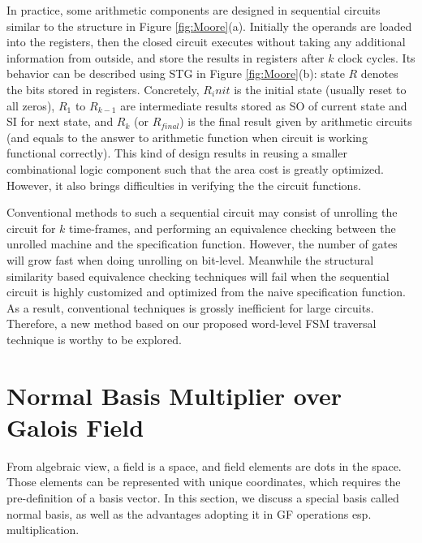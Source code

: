 In practice,
some arithmetic components are designed in sequential circuits similar to the structure in 
Figure \ref{fig:Moore}(a). Initially the operands are loaded into the registers, 
then the closed circuit executes without taking any additional information from outside,
and store the results in registers after $k$ clock cycles. Its behavior can be described using
STG in Figure \ref{fig:Moore}(b): state $R$ denotes the bits stored in registers. Concretely, $R_init$ is the initial
state (usually reset to all zeros), $R_1$ to $R_{k-1}$ are intermediate results stored as SO of current state and SI
for next state, and $R_k$ (or $R_{final}$) is the final result given by arithmetic circuits (and equals to the answer
to arithmetic function when circuit is working functional correctly).
This kind of design results in 
reusing a smaller combinational logic component such that the area cost is greatly optimized.
However, it also brings difficulties in verifying the the circuit functions.

\begin{figure}[H]
\end{figure}

Conventional methods to such a sequential circuit may consist of unrolling the circuit for 
$k$ time-frames, and performing an equivalence checking between the unrolled machine and
the specification function. However, the number of gates will grow fast when doing unrolling
on bit-level. Meanwhile the structural similarity based equivalence checking techniques 
will fail when the sequential circuit is highly customized and optimized from the naive specification 
function. As a result, conventional techniques is grossly inefficient for large circuits.
Therefore, a new method based on our proposed word-level FSM traversal technique is worthy to be explored.

\section{Normal Basis Multiplier over Galois Field}
From algebraic view, a field is a space, and field elements are dots in the space. Those elements can be 
represented with unique coordinates, which requires the pre-definition of a basis vector. In this
section, we discuss a special basis called normal basis, as well as the advantages adopting it in 
GF operations esp. multiplication.
